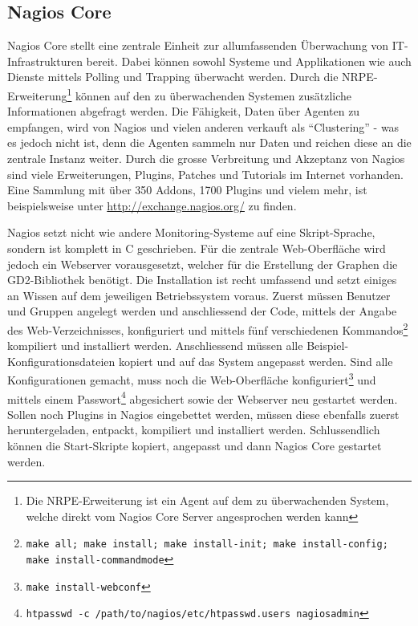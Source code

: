 \subsection{Nagios Core} \label{sec:systeme-nagios}  
  Nagios Core\cite{nagios} stellt eine zentrale Einheit zur allumfassenden \"Uberwachung von IT-Infrastrukturen bereit. Dabei k\"onnen sowohl Systeme und Applikationen wie auch Dienste mittels Polling und Trapping \"uberwacht werden. Durch die NRPE-Erweiterung\footnote{\label{foot:nagios-nrpe}Die NRPE-Erweiterung ist ein Agent auf dem zu \"uberwachenden System, welche direkt vom Nagios Core Server angesprochen werden kann} k\"onnen auf den zu \"uberwachenden Systemen zus\"atzliche Informationen abgefragt werden. Die F\"ahigkeit, Daten \"uber Agenten zu empfangen, wird von Nagios und vielen anderen verkauft als "`Clustering"' - was es jedoch nicht ist, denn die Agenten sammeln nur Daten und reichen diese an die zentrale Instanz weiter. Durch die grosse Verbreitung und Akzeptanz von Nagios sind viele Erweiterungen, Plugins, Patches und Tutorials im Internet vorhanden. Eine Sammlung mit \"uber 350 Addons, 1700 Plugins und vielem mehr, ist beispielsweise unter \url{http://exchange.nagios.org/} zu finden.

  Nagios setzt nicht wie andere Monitoring-Systeme auf eine Skript-Sprache, sondern ist komplett in C geschrieben. F\"ur die zentrale Web-Oberfl\"ache wird jedoch ein Webserver vorausgesetzt, welcher f\"ur die Erstellung der Graphen die GD2-Bibliothek ben\"otigt. Die Installation ist recht umfassend und setzt einiges an Wissen auf dem jeweiligen Betriebssystem voraus. Zuerst m\"ussen Benutzer und Gruppen angelegt werden und anschliessend der Code, mittels der Angabe des Web-Verzeichnisses, konfiguriert und mittels f\"unf verschiedenen Kommandos\footnote{\label{foot:nagios-compile}\texttt{make all; make install; make install-init; make install-config; make install-commandmode}} kompiliert und installiert werden. Anschliessend m\"ussen alle Beispiel-Konfigurationsdateien kopiert und auf das System angepasst werden. Sind alle Konfigurationen gemacht, muss noch die Web-Oberfl\"ache konfiguriert\footnote{\label{foot:nagios-compile-web}\texttt{make install-webconf}} und mittels einem Passwort\footnote{\label{foot:nagios-compile-pass}\texttt{htpasswd -c /path/to/nagios/etc/htpasswd.users nagiosadmin}} abgesichert sowie der Webserver neu gestartet werden. Sollen noch Plugins in Nagios eingebettet werden, m\"ussen diese ebenfalls zuerst heruntergeladen, entpackt, kompiliert und installiert werden. Schlussendlich k\"onnen die Start-Skripte kopiert, angepasst und dann Nagios Core gestartet werden.

